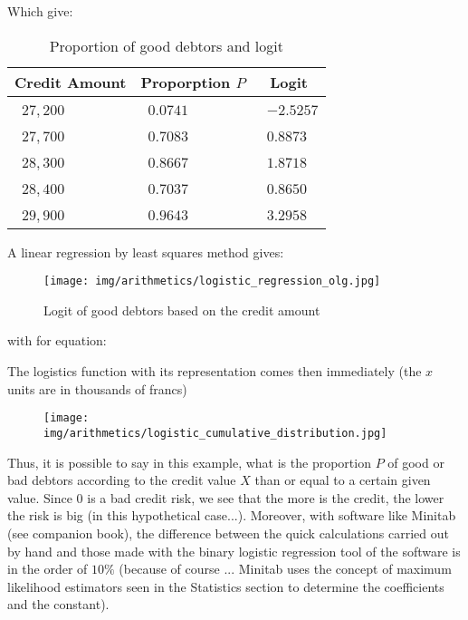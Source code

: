 	Which give:
	\begin{table}[H]
		\begin{center}
			\begin{tabular}{|p{2cm}|p{2cm}|p{2cm}|}
					\hline
					\multicolumn{1}{c}{\cellcolor{black!30}\textbf{Credit Amount}} & 
	  \multicolumn{1}{c}{\cellcolor{black!30}\textbf{Proporption $P$}}  & \multicolumn{1}{c}{\cellcolor{black!30}\textbf{Logit}}\\ \hline
					\centering\arraybackslash\ $27,200$ & \centering\arraybackslash\ $0.0741$ & \centering\arraybackslash\ $	
-2.5257$ \\ \hline
					\centering\arraybackslash\ $27,700$ & \centering\arraybackslash\ $0.7083$ & \centering\arraybackslash\ $0.8873$ \\ \hline
					\centering\arraybackslash\ $28,300$ & \centering\arraybackslash\ $0.8667$ & \centering\arraybackslash\ $1.8718$ \\ \hline
					\centering\arraybackslash\ $28,400$ & \centering\arraybackslash\ $0.7037$ & \centering\arraybackslash\ $0.8650$ \\ \hline
					\centering\arraybackslash\ $29,900$ & \centering\arraybackslash\ $0.9643$ & \centering\arraybackslash\ $3.2958$ \\ \hline
			\end{tabular}
		\end{center}
		\caption[]{Proportion of good debtors and logit}
	\end{table}
	A linear regression by least squares method gives:
	\begin{figure}[H]
		\centering
		\texttt{[image: img/arithmetics/logistic\_regression\_olg.jpg]}
		\caption{Logit of good debtors based on the credit amount}
	\end{figure}
	with for equation:
	
	The logistics function with its representation comes then immediately (the $x$ units are in thousands of francs)
	
	\begin{figure}[H]
		\centering
		\texttt{[image: img/arithmetics/logistic\_cumulative\_distribution.jpg]}
	\end{figure}
	Thus, it is possible to say in this example, what is the proportion $P$ of good or bad debtors according to the credit value $X$ than or equal to a certain given value. Since $0$ is a bad credit risk, we see that the more is the credit, the lower the risk is big (in this hypothetical case...). Moreover, with software like Minitab (see companion book), the difference between the quick calculations carried out by hand and those made with the binary logistic regression tool  of the software is in the order of $10\%$ (because of course ... Minitab uses the concept of maximum likelihood estimators seen in the Statistics section to determine the coefficients and the constant).
	
